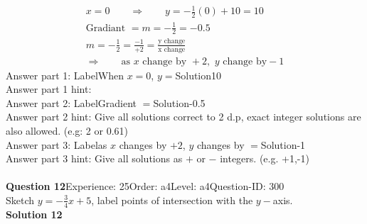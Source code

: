 \documentclass{article}
\begin{document}
\\[-35pt]\begin{align*}
&x=0\qquad\Rightarrow\qquad y=-\displaystyle\frac{1}{2}(0)+10=10&\\[2pt]
&\text{Gradiant}\,\,=m=-\displaystyle\frac{1}{2}=-0.5&\\[2pt]
&m=-\displaystyle\frac{1}{2}=\displaystyle\frac{-1}{+2}=\displaystyle\frac{\text{y change}}{\text{x change}}&\\[2pt]
& \Rightarrow\qquad \text{as}\,\, x \,\,\text{change by } +2,\,\, y\,\, \text{change by} -1 &
\end{align*}
Answer part 1: \hspace{10pt}Label\hspace{10pt}When $x=0$, $y=$\hspace{10pt}Solution\hspace{10pt}10\\
Answer part 1 hint: \hspace{15pt}\\
Answer part 2: \hspace{10pt}Label\hspace{10pt}Gradient $=$\hspace{10pt}Solution\hspace{10pt}-0.5\\
Answer part 2 hint: \hspace{15pt}Give all solutions correct to 2 d.p, exact integer solutions are also allowed. (e.g: 2 or 0.61)\\
Answer part 3: \hspace{10pt}Label\hspace{10pt}as $x$ changes by $+2$, $y$ changes by $=$\hspace{10pt}Solution\hspace{10pt}-1\\
Answer part 3 hint: \hspace{15pt}Give all solutions as $+$ or $-$ integers. (e.g. +1,-1)\\
\\[4pt]
\noindent\textbf{Question 12}\hspace{20pt}Experience: 25\hspace{20pt}Order: a4\hspace{20pt}Level: a4\hspace{20pt}Question-ID: 300\\[2pt]
Sketch $y=-\displaystyle\frac{3}{4}x+5$, label points of intersection with the $y-$axis.\\[4pt]
\noindent\textbf{Solution 12}\\[2pt]
\end{document}
